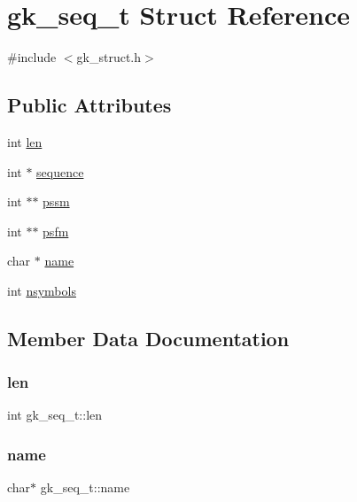 \hypertarget{a00674}{}\section{gk\+\_\+seq\+\_\+t Struct Reference}
\label{a00674}


{\ttfamily \#include $<$gk\+\_\+struct.\+h$>$}

\subsection*{Public Attributes}
\begin{DoxyCompactItemize}
\item 
int \hyperlink{a00674_a4970c7091d86284d10ae370aa9bf0145}{len}
\item 
int $\ast$ \hyperlink{a00674_a5a803ced386350dd152f047531035f81}{sequence}
\item 
int $\ast$$\ast$ \hyperlink{a00674_aca3f51322bd7246f338394a442e37e7c}{pssm}
\item 
int $\ast$$\ast$ \hyperlink{a00674_a2f3676712f6cbb159642884a3dff7eec}{psfm}
\item 
char $\ast$ \hyperlink{a00674_a231b4df61c5c3501eff97c408dc882b3}{name}
\item 
int \hyperlink{a00674_a876b72b49af40e66b978e33f87cda044}{nsymbols}
\end{DoxyCompactItemize}


\subsection{Member Data Documentation}
\mbox{\label{a00674_a4970c7091d86284d10ae370aa9bf0145}} 
\subsubsection{\texorpdfstring{len}{len}}
{\footnotesize\ttfamily int gk\+\_\+seq\+\_\+t\+::len}

\mbox{\label{a00674_a231b4df61c5c3501eff97c408dc882b3}} 
\subsubsection{\texorpdfstring{name}{name}}
{\footnotesize\ttfamily char$\ast$ gk\+\_\+seq\+\_\+t\+::name}

